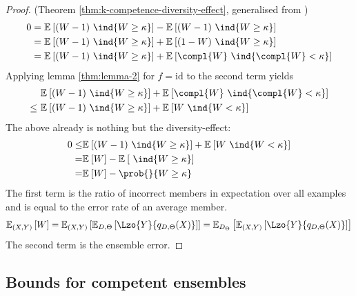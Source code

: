 \documentclass[../main.tex]{subfiles}
\begin{document}
\begin{proof} (Theorem \ref{thm:k-competence-diversity-effect}, generalised from \cite{theisen_WhenAreEnsembles_2023})
    \begin{align*}
        0 &= \mathbb{E}_{}\left[ (W-1)~\ind{W \geq \kappa} \right]  - \mathbb{E}_{}\left[ (W-1) ~\ind{W \geq \kappa} \right]  \\
        &= \mathbb{E}_{}\left[ (W-1)~\ind{W \geq \kappa} \right]  + \mathbb{E}_{}\left[ (1-W)~\ind{W \geq \kappa} \right]  \\
        &= \mathbb{E}_{}\left[ (W-1)~\ind{W \geq \kappa} \right]  + \mathbb{E}_{}\left[  \compl{W} ~\ind{\compl{W} < \kappa} \right]   \\
    \end{align*}
    Applying lemma \ref{thm:lemma-2} for $f = \text{id}$ to the second term yields
    \begin{align*}
        & \mathbb{E}_{}\left[ (W-1)~\ind{W \geq \kappa} \right]  + \mathbb{E}_{}\left[  \compl{W} ~\ind{\compl{W} < \kappa} \right]   \\  
        \leq~ &  \mathbb{E}_{}\left[ (W-1)~\ind{W \geq \kappa} \right]  + \mathbb{E}_{}\left[ W ~\ind{W < \kappa} \right] 
    \end{align*}
    The above already is nothing but the diversity-effect:
    \begin{align*}
        0 \leq& \mathbb{E}_{}\left[ (W-1)~\ind{W \geq \kappa} \right]  + \mathbb{E}_{}\left[ W ~\ind{W < \kappa} \right]  \\
        = & \mathbb{E}_{}\left[ W  \right]  - \mathbb{E}_{}\left[ ~\ind{W \geq \kappa} \right]  \\
        = & \mathbb{E}_{}\left[ W \right]  - \prob{}{W \geq \kappa}
    \end{align*}
    The first term is the ratio of incorrect members in expectation over all examples and is equal to the error rate of an average member.
    \begin{align*} 
    \mathbb{E}_{(X,Y) }\left[ W  \right]  = \mathbb{E}_{(X,Y) }\left[ \mathbb{E}_{D,\Theta}\left[ \Lzo{Y}{q_{D,\Theta}(X)} \right]  \right]  = \mathbb{E}_{D_{\Theta}}\left[ \mathbb{E}_{(X,Y) }\left[ \Lzo{Y}{q_{D,\Theta}(X)} \right]  \right] 
    \end{align*}
    The second term is the ensemble error. 
\end{proof}

\subsection{Bounds for competent ensembles}
\end{document}
